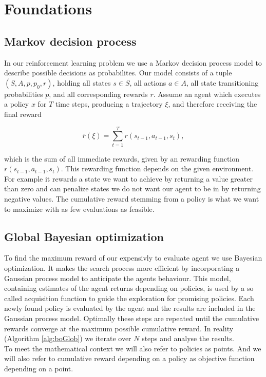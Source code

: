 \chapter{Foundations}
\label{chap:2}

\section{Markov decision process}
In our reinforcement learning problem we use a Markov decision process model to describe possible decisions as probabilites. Our model consists of a tuple $(S,A,p,p_{0},r)$, holding all states $s \in S$, all actions $a \in A$, all state transitioning probabilities $p$, and all corresponding rewards $r$. Assume an agent which executes a policy $x$ for $T$ time steps, producing a trajectory $\xi$, and therefore receiving the final reward

$$\bar{r}(\xi)=\sum_{t=1}^T r(s_{t-1}, a_{t-1}, s_{t}),$$

which is the sum of all immediate rewards, given by an rewarding function $r(s_{t-1}, a_{t-1}, s_{t})$. This rewarding function depends on the given environment. For example it rewards a state we want to achieve by returning a value greater than zero and can penalize states we do not want our agent to be in by returning negative values. The cumulative reward stemming from a policy is what we want to maximize with as few evaluations as feasible.

\section{Global Bayesian optimization}
To find the maximum reward of our expensivly to evaluate agent we use Bayesian optimization. It makes the search process more efficient by incorporating a Gaussian process model to  anticipate the agents behaviour. This model, containing estimates of the agent returns depending on policies, is used by a so called acquisition function to guide the exploration for promising policies. Each newly found policy is evaluated by the agent and the results are included in the Gaussian process model. Optimally these steps are repeated until the cumulative rewards converge at the maximum possible cumulative reward. In reality (Algorithm \ref{alg:boGlob}) we iterate over $N$ steps and analyse the results.\\
To meet the mathematical context we will also refer to policies as points. And we will also refer to cumulative reward depending on a policy as objective function depending on a point.

